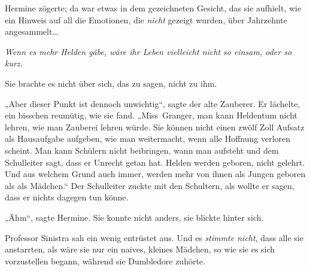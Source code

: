 Hermine zögerte; da war etwas in dem gezeichneten Gesicht, das sie aufhielt, wie ein Hinweis auf all die Emotionen, die \emph{nicht} gezeigt wurden, über Jahrzehnte angesammelt…

\emph{Wenn es mehr Helden gäbe, wäre ihr Leben vielleicht nicht so einsam, oder so kurz.}

Sie brachte es nicht über sich, das zu sagen, nicht zu ihm.

„Aber dieser Punkt ist dennoch unwichtig“, sagte der alte Zauberer. Er lächelte, ein bisschen reumütig, wie sie fand.
„Miss~Granger, man kann Heldentum nicht lehren, wie man Zauberei lehren würde. Sie können nicht einen zwölf Zoll Aufsatz als Hausaufgabe aufgeben, wie man weitermacht, wenn alle Hoffnung verloren scheint. Man kann Schülern nicht beibringen, wann man aufsteht und dem Schulleiter sagt, dass er Unrecht getan hat. Helden werden geboren, nicht gelehrt. Und aus welchem Grund auch immer, werden mehr von ihnen als Jungen geboren als als Mädchen.“ Der Schulleiter zuckte mit den Schultern, als wollte er sagen, dass er nichts dagegen tun könne.

„Ähm“, sagte Hermine. Sie konnte nicht anders, sie blickte hinter sich.

Professor Sinistra sah ein wenig entrüstet aus. Und es \emph{stimmte nicht}, dass alle sie anstarrten, als wäre sie nur ein naives, kleines Mädchen, so wie sie es sich vorzustellen begann, während sie Dumbledore zuhörte.

